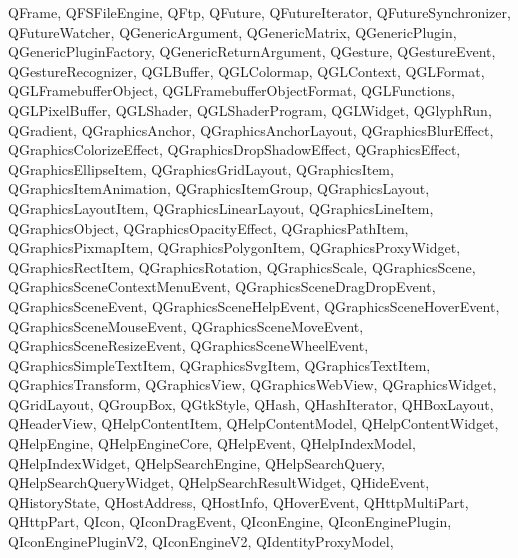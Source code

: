 {{        QFrame,
        QFSFileEngine,
        QFtp,
        QFuture,
        QFutureIterator,
        QFutureSynchronizer,
        QFutureWatcher,
        QGenericArgument,
        QGenericMatrix,
        QGenericPlugin,
        QGenericPluginFactory,
        QGenericReturnArgument,
        QGesture,
        QGestureEvent,
        QGestureRecognizer,
        QGLBuffer,
        QGLColormap,
        QGLContext,
        QGLFormat,
        QGLFramebufferObject,
        QGLFramebufferObjectFormat,
        QGLFunctions,
        QGLPixelBuffer,
        QGLShader,
        QGLShaderProgram,
        QGLWidget,
        QGlyphRun,
        QGradient,
        QGraphicsAnchor,
        QGraphicsAnchorLayout,
        QGraphicsBlurEffect,
        QGraphicsColorizeEffect,
        QGraphicsDropShadowEffect,
        QGraphicsEffect,
        QGraphicsEllipseItem,
        QGraphicsGridLayout,
        QGraphicsItem,
        QGraphicsItemAnimation,
        QGraphicsItemGroup,
        QGraphicsLayout,
        QGraphicsLayoutItem,
        QGraphicsLinearLayout,
        QGraphicsLineItem,
        QGraphicsObject,
        QGraphicsOpacityEffect,
        QGraphicsPathItem,
        QGraphicsPixmapItem,
        QGraphicsPolygonItem,
        QGraphicsProxyWidget,
        QGraphicsRectItem,
        QGraphicsRotation,
        QGraphicsScale,
        QGraphicsScene,
        QGraphicsSceneContextMenuEvent,
        QGraphicsSceneDragDropEvent,
        QGraphicsSceneEvent,
        QGraphicsSceneHelpEvent,
        QGraphicsSceneHoverEvent,
        QGraphicsSceneMouseEvent,
        QGraphicsSceneMoveEvent,
        QGraphicsSceneResizeEvent,
        QGraphicsSceneWheelEvent,
        QGraphicsSimpleTextItem,
        QGraphicsSvgItem,
        QGraphicsTextItem,
        QGraphicsTransform,
        QGraphicsView,
        QGraphicsWebView,
        QGraphicsWidget,
        QGridLayout,
        QGroupBox,
        QGtkStyle,
        QHash,
        QHashIterator,
        QHBoxLayout,
        QHeaderView,
        QHelpContentItem,
        QHelpContentModel,
        QHelpContentWidget,
        QHelpEngine,
        QHelpEngineCore,
        QHelpEvent,
        QHelpIndexModel,
        QHelpIndexWidget,
        QHelpSearchEngine,
        QHelpSearchQuery,
        QHelpSearchQueryWidget,
        QHelpSearchResultWidget,
        QHideEvent,
        QHistoryState,
        QHostAddress,
        QHostInfo,
        QHoverEvent,
        QHttpMultiPart,
        QHttpPart,
        QIcon,
        QIconDragEvent,
        QIconEngine,
        QIconEnginePlugin,
        QIconEnginePluginV2,
        QIconEngineV2,
        QIdentityProxyModel,
}}
